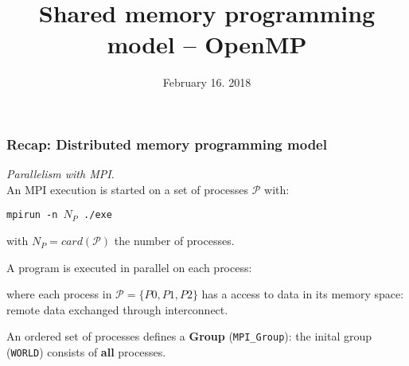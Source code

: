 

\title{Shared memory programming model -- OpenMP}
\date{February 16. 2018}

\maketitle

\begin{frame}
  \frametitle{Recap: Distributed memory programming model}

\textit{Parallelism with MPI}.\\
An MPI execution is started on a set of processes $\mathcal{P}$ with:
\begin{center}
\texttt{mpirun -n $N_P$ ./exe}
\end{center}
with $\texttt{$N_P$} = card(\mathcal{P})$ the number of processes.

\bigskip
A program is executed in parallel on each process:
\begin{center}
    \scalebox{0.8}{}
\end{center}
where each process in $\mathcal{P} = \lbrace P0, P1, P2 \rbrace$ has a access to data in its memory space: remote data exchanged through interconnect.

\medskip
An ordered set of processes defines a \textbf{Group} (\texttt{MPI\_Group}): the inital group (\texttt{WORLD}) consists of \textbf{all} processes.

\end{frame}

